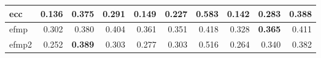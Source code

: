 \begin{tabular}{l:rrr:rrr:rrr}
	\acrshort{ecc}                          & 0.136                                      & 0.375          & 0.291 & 0.149 & 0.227          & 0.583 & 0.142          & 0.283 & 0.388 \\
	\hline
	\acrshort{efmp}
	                                        &
	0.302                                   & 0.380                                      & 0.404          & 0.361 & 0.351 & 0.418          & 0.328 & \textbf{0.365} & 0.411         \\
	\acrshort{efmp2}
	                                        & 0.252                                      &
	\textbf{0.389}                          & 0.303                                      & 0.277          & 0.303 & 0.516 & 0.264          & 0.340 & 0.382                          \\
	\bottomrule
\end{tabular}
